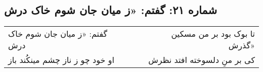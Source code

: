\begin{center}
\section*{شماره ۲۱: گفتم: «ز میان جان شوم خاک درش}
\label{sec:021}
\begin{longtable}{l p{0.5cm} r}
گفتم: «ز میان جان شوم خاک درش
&&
تا بوک بود بر من مسکین گذرش»
\\
او خود چو ز ناز چشم مینکُند باز
&&
کی بر منِ دلسوخته افتد نظرش
\\
\end{longtable}
\end{center}
